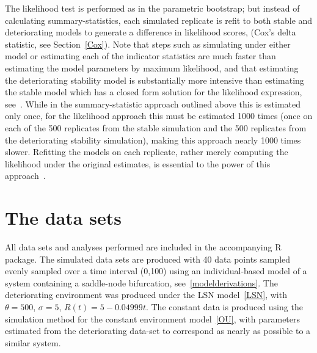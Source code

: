 \documentclass[authoryear, preprint,review,12pt]{elsarticle}
\begin{document}
The likelihood test is performed as in the parametric bootstrap; but instead of calculating summary-statistics, each simulated replicate is refit to both stable and deteriorating models to generate a difference in likelihood scores, (Cox's delta statistic, see Section~\ref{Cox}).  Note that steps such as simulating under either model or estimating each of the indicator statistics are much faster than estimating the model parameters by maximum likelihood, and that estimating the deteriorating stability model is substantially more intensive than estimating the stable model which has a closed form solution for the likelihood expression, see~\citet{likelihood}.  While in the summary-statistic approach outlined above this is estimated only once, for the likelihood approach this must be estimated 1000 times (once on each of the 500 replicates from the stable simulation and the 500 replicates from the deteriorating stability simulation), making this approach nearly 1000 times slower.  Refitting the models on each replicate, rather merely computing the likelihood under the original estimates, is essential to the power of this approach~\citep{Huelsenbeck1996}.⁠


\section{The data sets}\label{data}
All data sets and analyses performed are included in the accompanying R package.
The simulated data sets are produced with 40 data points
sampled evenly sampled over a time interval (0,100) using an individual-based model of a system containing a saddle-node bifurcation, see~\ref{modelderivations}.
The deteriorating environment was produced under the LSN model~\eqref{LSN}, with $\theta=500$, $\sigma = 5$, $R(t) = 5 - 0.04999 t$.  
The constant data is produced using the simulation method for the constant environment model~\eqref{OU},
with parameters estimated from the deteriorating data-set to correspond as nearly as possible to a similar system.
\end{document}
